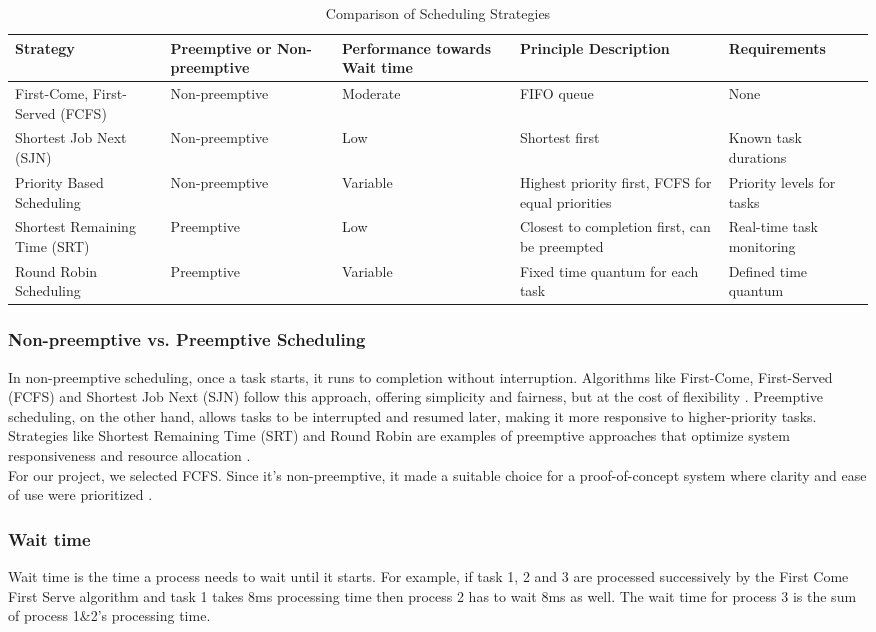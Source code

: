 \documentclass{article}
\begin{document}
\begin{table}[h!]
\centering
\begin{tabularx}{\textwidth}{|>{\centering\arraybackslash}m{2.5cm}|>{\centering\arraybackslash}m{2.93cm}|>{\centering\arraybackslash}m{2.9cm}|>{\centering\arraybackslash}m{2.9cm}|>{\centering\arraybackslash}m{2.5cm}|}
    \hline
    \textbf{Strategy} &
    \textbf{Preemptive or Non-preemptive} &
    \textbf{Performance towards Wait time} &
    \textbf{Principle Description} &
    \textbf{Requirements} \tabularnewline
    \hline
    First-Come, First-Served (FCFS) & Non-preemptive & Moderate & FIFO queue & None \tabularnewline
    \hline
    Shortest Job Next (SJN) & Non-preemptive & Low & Shortest first & Known task durations \tabularnewline
    \hline
    Priority Based Scheduling & Non-preemptive & Variable & Highest priority first, FCFS for equal priorities & Priority levels for tasks \tabularnewline
    \hline
    Shortest Remaining Time (SRT) & Preemptive & Low & Closest to completion first, can be preempted & Real-time task monitoring \tabularnewline
    \hline
    Round Robin Scheduling & Preemptive & Variable & Fixed time quantum for each task & Defined time quantum \tabularnewline
    \hline
\end{tabularx}
\caption{Comparison of Scheduling Strategies}
\end{table}

\subsubsection{Non-preemptive vs. Preemptive Scheduling}
In non-preemptive scheduling, once a task starts, it runs to completion without interruption. Algorithms like First-Come, First-Served (FCFS) and Shortest Job Next (SJN) follow this approach, offering simplicity and fairness, but at the cost of flexibility \cite{Tyagi & Gupta, 2018}. Preemptive scheduling, on the other hand, allows tasks to be interrupted and resumed later, making it more responsive to higher-priority tasks. Strategies like Shortest Remaining Time (SRT) and Round Robin are examples of preemptive approaches that optimize system responsiveness and resource allocation \cite{Jalali et al., 2024}.\\

For our project, we selected FCFS. Since it's non-preemptive, it made a suitable choice for a proof-of-concept system where clarity and ease of use were prioritized \cite{Tyagi & Gupta, 2018}.
\subsubsection{Wait time}
Wait time is the time a process needs to wait until it starts. For example, if task 1, 2 and 3 are processed successively by the First Come First Serve algorithm and task 1 takes 8ms processing time then process 2 has to wait 8ms as well. The wait time for process 3 is the sum of process 1&2's processing time.
\end{document}
